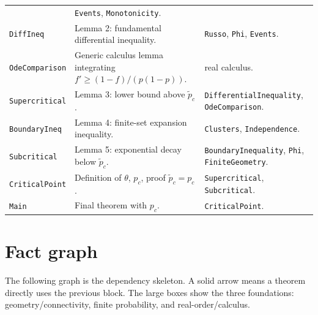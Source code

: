 \documentclass[11pt]{article}
\newcommand{\pcrit}{p_c}
\newcommand{\ptilde}{\widetilde p_c}
\theoremstyle{definition}
\theoremstyle{plain}
\begin{document}
{\begin{longtable}{p{}p{}p{}}
& \texttt{Events}, \texttt{Monotonicity}.\\
\addlinespace
\texttt{DiffIneq}
& Lemma 2: fundamental differential inequality.
& \texttt{Russo}, \texttt{Phi}, \texttt{Events}.\\
\addlinespace
\texttt{OdeComparison}
& Generic calculus lemma integrating $f'\ge(1-f)/(p(1-p))$.
& real calculus.\\
\addlinespace
\texttt{Supercritical}
& Lemma 3: lower bound above $\ptilde$.
& \texttt{DifferentialInequality}, \texttt{OdeComparison}.\\
\addlinespace
\texttt{BoundaryIneq}
& Lemma 4: finite-set expansion inequality.
& \texttt{Clusters}, \texttt{Independence}.\\
\addlinespace
\texttt{Subcritical}
& Lemma 5: exponential decay below $\ptilde$.
& \texttt{BoundaryInequality}, \texttt{Phi}, \texttt{FiniteGeometry}.\\
\addlinespace
\texttt{CriticalPoint}
& Definition of $\theta$, $\pcrit$, proof $\ptilde=\pcrit$.
& \texttt{Supercritical}, \texttt{Subcritical}.\\
\addlinespace
\texttt{Main}
& Final theorem with $\pcrit$.
& \texttt{CriticalPoint}.\\
\bottomrule
\end{longtable}
}

\section{Fact graph}

The following graph is the dependency skeleton.  A solid arrow means a theorem directly uses the previous block.  The large boxes show the three foundations: geometry/connectivity, finite probability, and real-order/calculus.
\end{document}
